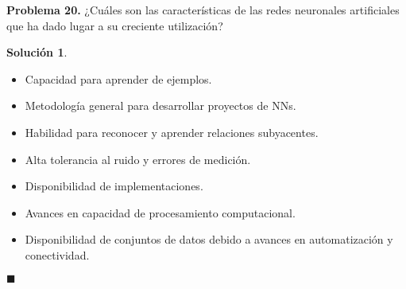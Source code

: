 \documentclass[12pt]{article}
\theoremstyle{plain}
\theoremstyle{definition}
\theoremstyle{definition}
\theoremstyle{definition}
\newtheorem*{solution}{Solución}
\begin{document}
\noindent \textbf{Problema 20.} ¿Cuáles son las características de las redes neuronales artificiales que ha dado lugar a su creciente utilización?
\begin{solution}
\begin{itemize}
    \item Capacidad para aprender de ejemplos.
    \item Metodología general para desarrollar proyectos de NNs.
    \item Habilidad para reconocer y aprender relaciones subyacentes.
    \item Alta tolerancia al ruido y errores de medición.
    \item Disponibilidad de implementaciones.
    \item Avances en capacidad de procesamiento computacional.
    \item Disponibilidad de conjuntos de datos debido a avances en automatización y conectividad.
\end{itemize}
\end{solution}
\begin{flushright}
$\blacksquare$
\end{flushright}


\newpage


\end{document}
